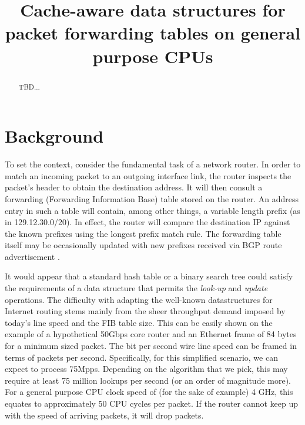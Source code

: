 \documentclass[conference,compsoc]{IEEEtran}
\begin{document}
\title{Cache-aware data structures for packet forwarding tables on general purpose CPUs}
\author{
}

\maketitle

\begin{abstract}
TBD...

\end{abstract}

\section{Background}
To set the context, consider the fundamental task of a network router.
In order to match an incoming packet to an outgoing interface link,
the router inspects the packet's header to obtain the destination address.
It will then consult a forwarding (Forwarding Information Base) table 
stored on the router.
An address entry in such a table will contain, among other things,
a variable length prefix (as in 129.12.30.0/20).
In effect, the router will compare the destination IP
against the known prefixes using the longest prefix match rule.
The forwarding table itself may be occasionally updated with new prefixes
received via BGP route advertisement \cite{Kurose:Networking}.

It would appear that a standard hash table or a binary search tree could
satisfy the requirements of a data structure that permits the 
\textit{look-up} and \textit{update} operations. The difficulty with 
adapting the well-known 
datastructures for Internet routing stems mainly from the sheer throughput
demand imposed by today's line speed and the FIB table size.
This can be easily shown on the example of a hypothetical 50Gbps core router 
and an Ethernet frame of 84 bytes for a minimum sized packet. 
The bit per second 
wire line speed can be framed in terms of packets per second. Specifically,
for this simplified scenario, we can expect to process 75Mpps. Depending on
the algorithm that we pick, this may require at least 75 million lookups 
per second (or an order of magnitude more). For a general purpose CPU clock
speed of (for the sake of example) 4 GHz, this equates to approximately 
50 CPU cycles per packet. If the router cannot keep up with the speed of
arriving packets, it will drop packets.
\end{document}
